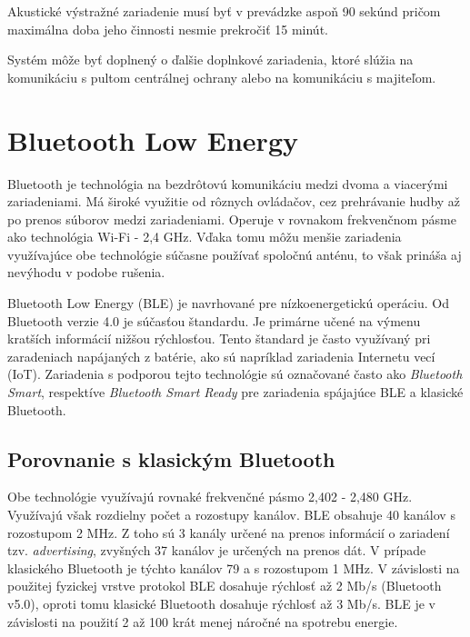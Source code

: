 Akustické výstražné zariadenie musí byť v prevádzke aspoň 90 sekúnd pričom maximálna doba jeho činnosti nesmie prekročiť 15 minút.\cite{csn-en-50131-1}

Systém môže byť doplnený o ďalšie doplnkové zariadenia, ktoré slúžia na komunikáciu s pultom centrálnej ochrany alebo na komunikáciu s majiteľom.\cite{Krecek}


\chapter{Bluetooth Low Energy}

Bluetooth je technológia na bezdrôtovú komunikáciu medzi dvoma a viacerými zariadeniami. Má široké využitie od rôznych ovládačov, cez prehrávanie hudby až po prenos súborov medzi zariadeniami. Operuje v rovnakom frekvenčnom pásme ako technológia Wi-Fi - 2,4 GHz. Vďaka tomu môžu menšie zariadenia využívajúce obe technológie súčasne používať spoločnú anténu, to však prináša aj nevýhodu v podobe rušenia.

Bluetooth Low Energy (BLE) je navrhované pre nízkoenergetickú operáciu. Od Bluetooth verzie 4.0 je súčasťou štandardu. Je primárne učené na výmenu kratších informácií nižšou rýchlosťou. Tento štandard je často využívaný pri zaradeniach napájaných z batérie, ako sú napríklad zariadenia Internetu vecí (IoT). Zariadenia s podporou tejto technológie sú označované často ako \textit{Bluetooth Smart}, respektíve \textit{Bluetooth Smart Ready} pre zariadenia spájajúce BLE a klasické Bluetooth.

\section{Porovnanie s klasickým Bluetooth}

Obe technológie využívajú rovnaké frekvenčné pásmo 2,402 - 2,480 GHz. Využívajú však rozdielny počet a rozostupy kanálov. BLE obsahuje 40 kanálov s rozostupom 2 MHz. Z toho sú 3 kanály určené na prenos informácií o zariadení tzv. \textit{advertising}, zvyšných 37 kanálov je určených na prenos dát. V prípade klasického Bluetooth je týchto kanálov 79 a s rozostupom 1 MHz. V závislosti na použitej fyzickej vrstve protokol BLE dosahuje rýchlosť až 2 Mb/s (Bluetooth v5.0), oproti tomu klasické Bluetooth dosahuje rýchlosť až 3 Mb/s. BLE je v závislosti na použití 2 až 100 krát menej náročné na spotrebu energie.
\cite{bluetooth}

